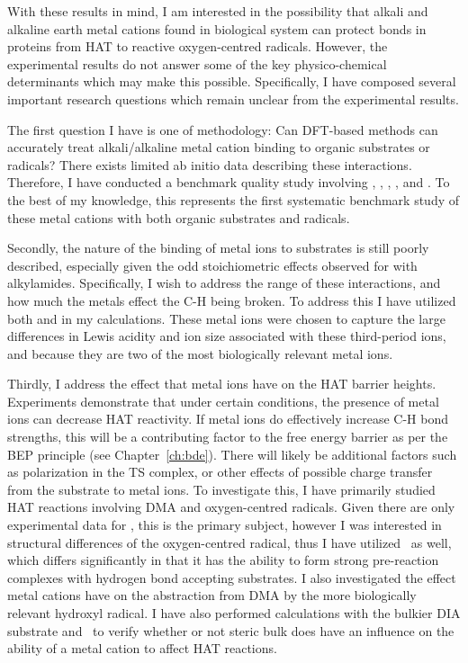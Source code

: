 With these results in mind, I am interested in the possibility that alkali and
alkaline earth metal cations found in biological system can protect 
bonds in proteins from HAT to reactive oxygen-centred radicals. However, the
experimental results do not answer some of the key physico-chemical determinants
which may make this possible. Specifically, I have composed several important
research questions which remain unclear from the experimental results.

The first question I have is one of methodology: Can DFT-based methods can
accurately treat alkali/alkaline metal cation binding to organic substrates or
radicals? There exists limited ab initio data describing these
interactions.\cite{ Siu2001, Corral2003, Suarez2011, Baldauf2013} Therefore, I
have conducted a benchmark quality study involving , ,
, , and . To the best of my knowledge, this
represents the first systematic benchmark study of these metal cations with both
organic substrates and radicals.

Secondly, the nature of the binding of metal ions to substrates is still poorly
described, especially given the odd stoichiometric effects observed for
 with alkylamides. Specifically, I wish to address the range of
these interactions, and how much the metals effect the C-H being broken. To
address this I have utilized both  and  in my calculations.
These metal ions were chosen to capture the large differences in Lewis acidity
and ion size associated with these third-period ions, and because they are two
of the most biologically relevant metal ions.

Thirdly, I address the effect that metal ions have on the HAT barrier heights.
Experiments demonstrate that under certain conditions, the presence of metal
ions can decrease HAT reactivity. If metal ions do effectively increase C-H bond
strengths, this will be a contributing factor to the free energy barrier as per
the BEP principle\cite{Bell1936,Evans1938} (see Chapter~\ref{ch:bde}). There
will likely be additional factors such as polarization in the TS complex, or
other effects of possible charge transfer from the substrate to metal ions. To
investigate this, I have primarily studied HAT reactions involving DMA and
oxygen-centred radicals. Given there are only experimental data for \cumo, this
is the primary subject, however I was interested in structural differences of
the oxygen-centred radical, thus I have utilized \bno\ as well, which differs
significantly in that it has the ability to form strong pre-reaction complexes
with hydrogen bond accepting substrates.\cite{Salamone2012, Salamone2013} I also
investigated the effect metal cations have on the abstraction from DMA by the
more biologically relevant hydroxyl radical. I have also performed calculations
with the bulkier DIA substrate and \cumo\ to verify whether or not steric bulk
does have an influence on the ability of a metal cation to affect HAT reactions.

